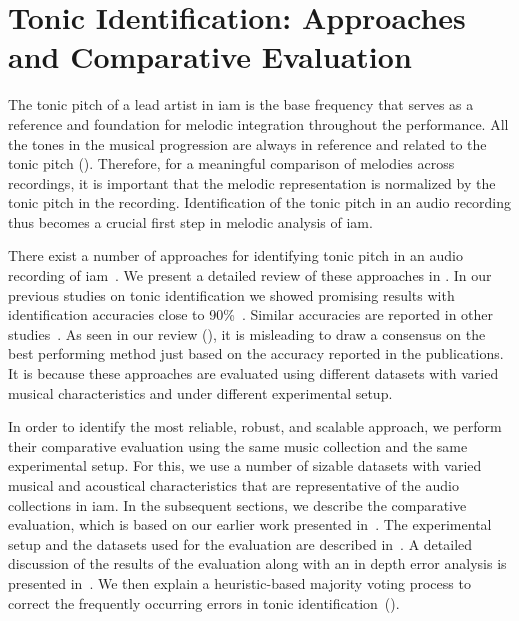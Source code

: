 \section{Tonic Identification: Approaches and Comparative Evaluation}
\label{sec:data_preprocessing_tonic_identification}

The tonic pitch of a lead artist in \gls{iam} is the base frequency that serves as a reference and foundation for melodic integration throughout the performance. All the tones in the musical progression are always in reference and related to the tonic pitch (). Therefore, for a meaningful comparison of melodies across recordings, it is important that the melodic representation is normalized by the tonic pitch in the recording. Identification of the tonic pitch in an audio recording thus becomes a crucial first step in melodic analysis of \gls{iam}. 

There exist a number of approaches for identifying tonic pitch in an audio recording of \gls{iam}~\citep{salamon2012multipitch,gulati2012two,bellur2012knowledge,ranjani2011carnatic,Sengupta2005b,chordia2013joint}. We present a detailed review of these approaches in . In our previous studies on tonic identification we showed promising results with identification accuracies close to 90\%~\citep{salamon2012multipitch,gulati2012two}. Similar accuracies are reported in other studies~\citep{ranjani2011carnatic,bellur2012knowledge}. As seen in our review (), it is misleading to draw a consensus on the best performing method just based on the accuracy reported in the publications. It is because these approaches are evaluated using different datasets with varied musical characteristics and under different experimental setup. 

In order to identify the most reliable, robust, and scalable approach, we perform their comparative evaluation using the same music collection and the same experimental setup. For this, we use a number of sizable datasets with varied musical and acoustical characteristics that are representative of the audio collections in \gls{iam}. In the subsequent sections, we describe the comparative evaluation, which is based on our earlier work presented in~\cite{Gulati2014Tonic}. The experimental setup and the datasets used for the evaluation are described in~. A detailed discussion of the results of the evaluation along with an in depth error analysis is presented in~. We then explain a heuristic-based majority voting process to correct the frequently occurring errors in tonic identification~(). 


